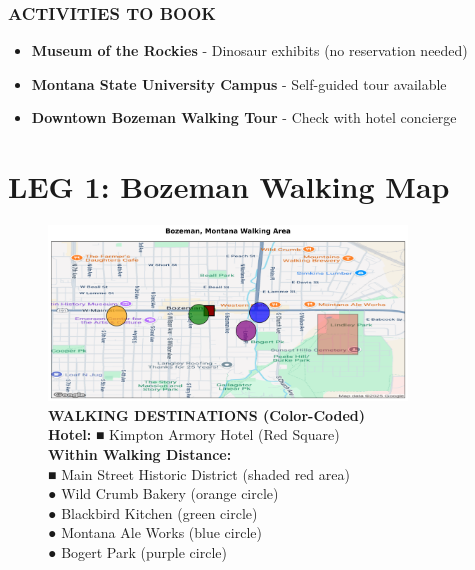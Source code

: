 \documentclass[
  10pt,
]{article}
\providecommand{\tightlist}{%
  \setlength{\itemsep}{0pt}\setlength{\parskip}{0pt}}
\begin{document}
\subsubsection{\texorpdfstring{\textcolor{primary}{ACTIVITIES TO BOOK}}{}}\label{section-8}

\begin{itemize}
\tightlist
\item
  \textbf{\textcolor{secondary}{Museum of the Rockies}} - Dinosaur
  exhibits (no reservation needed)
\item
  \textbf{\textcolor{secondary}{Montana State University Campus}} -
  Self-guided tour available
\item
  \textbf{\textcolor{secondary}{Downtown Bozeman Walking Tour}} - Check
  with hotel concierge
\end{itemize}

\newpage

\section{\texorpdfstring{\textcolor{primary}{LEG 1: Bozeman Walking Map}}{}}\label{section-9}

\begin{figure}[h]
\centering
\includegraphics[width=0.85\textwidth]{images/bozeman_mt_walking_map.png}
\caption{\textbf{\textcolor{primary}{WALKING DESTINATIONS (Color-Coded)}} \\ 
\textbf{\textcolor{secondary}{Hotel:}} \textcolor{mapred}{■} Kimpton Armory Hotel (Red Square) \\
\textbf{\textcolor{secondary}{Within Walking Distance:}} \\
\textcolor{mapred}{■} \textcolor{mapred}{Main Street Historic District} (shaded red area) \\
\textcolor{maporange}{●} \textcolor{maporange}{Wild Crumb Bakery} (orange circle) \\
\textcolor{mapgreen}{●} \textcolor{mapgreen}{Blackbird Kitchen} (green circle) \\
\textcolor{mapblue}{●} \textcolor{mapblue}{Montana Ale Works} (blue circle) \\
\textcolor{mappurple}{●} \textcolor{mappurple}{Bogert Park} (purple circle)}
\end{figure}
\end{document}
